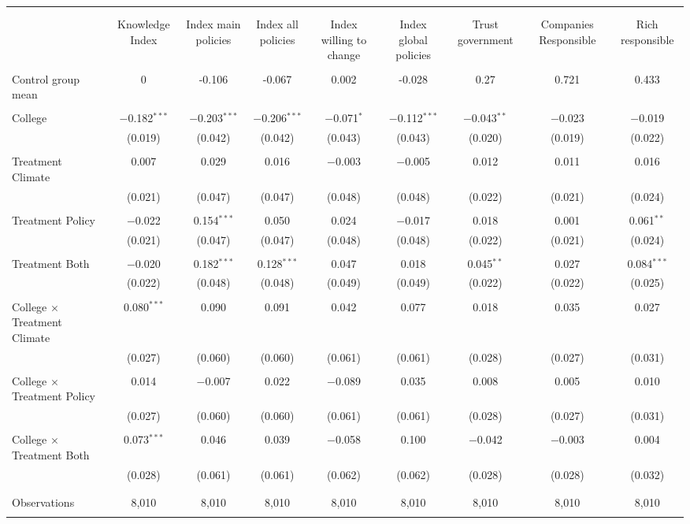 
\begin{tabular}{@{\extracolsep{5pt}}lcccccccc} 
\\[-1.8ex]\hline 
\hline \\[-1.8ex] 
\\[-1.8ex] & Knowledge Index & Index main policies & Index all policies & Index willing to change & Index global policies & Trust government & Companies Responsible & Rich responsible \\ 
\hline \\[-1.8ex] 
 Control group mean & 0 & -0.106 & -0.067 & 0.002 & -0.028 & 0.27 & 0.721 & 0.433  \\ \hline \\[-1.8ex] College & $-$0.182$^{***}$ & $-$0.203$^{***}$ & $-$0.206$^{***}$ & $-$0.071$^{*}$ & $-$0.112$^{***}$ & $-$0.043$^{**}$ & $-$0.023 & $-$0.019 \\ 
  & (0.019) & (0.042) & (0.042) & (0.043) & (0.043) & (0.020) & (0.019) & (0.022) \\ 
  & & & & & & & & \\ 
 Treatment Climate & 0.007 & 0.029 & 0.016 & $-$0.003 & $-$0.005 & 0.012 & 0.011 & 0.016 \\ 
  & (0.021) & (0.047) & (0.047) & (0.048) & (0.048) & (0.022) & (0.021) & (0.024) \\ 
  & & & & & & & & \\ 
 Treatment Policy & $-$0.022 & 0.154$^{***}$ & 0.050 & 0.024 & $-$0.017 & 0.018 & 0.001 & 0.061$^{**}$ \\ 
  & (0.021) & (0.047) & (0.047) & (0.048) & (0.048) & (0.022) & (0.021) & (0.024) \\ 
  & & & & & & & & \\ 
 Treatment Both & $-$0.020 & 0.182$^{***}$ & 0.128$^{***}$ & 0.047 & 0.018 & 0.045$^{**}$ & 0.027 & 0.084$^{***}$ \\ 
  & (0.022) & (0.048) & (0.048) & (0.049) & (0.049) & (0.022) & (0.022) & (0.025) \\ 
  & & & & & & & & \\ 
 College $\times$ Treatment Climate & 0.080$^{***}$ & 0.090 & 0.091 & 0.042 & 0.077 & 0.018 & 0.035 & 0.027 \\ 
  & (0.027) & (0.060) & (0.060) & (0.061) & (0.061) & (0.028) & (0.027) & (0.031) \\ 
  & & & & & & & & \\ 
 College $\times$ Treatment Policy & 0.014 & $-$0.007 & 0.022 & $-$0.089 & 0.035 & 0.008 & 0.005 & 0.010 \\ 
  & (0.027) & (0.060) & (0.060) & (0.061) & (0.061) & (0.028) & (0.027) & (0.031) \\ 
  & & & & & & & & \\ 
 College $\times$ Treatment Both & 0.073$^{***}$ & 0.046 & 0.039 & $-$0.058 & 0.100 & $-$0.042 & $-$0.003 & 0.004 \\ 
  & (0.028) & (0.061) & (0.061) & (0.062) & (0.062) & (0.028) & (0.028) & (0.032) \\ 
  & & & & & & & & \\ 
\hline \\[-1.8ex] 

Observations & 8,010 & 8,010 & 8,010 & 8,010 & 8,010 & 8,010 & 8,010 & 8,010 \\ 
\hline 
\hline \\[-1.8ex] 
\end{tabular} 